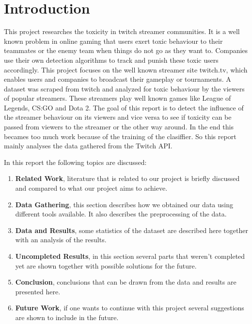 \documentclass[final]{report}
\begin{document}
\chapter{Introduction}
\label{ch:introduction}

This project researches the toxicity in twitch streamer communities.
It is a well known problem in online gaming that users exert toxic behaviour to their teammates or the enemy team when things do not go as they want to.
Companies use their own detection algorithms to track and punish these toxic users accordingly.
This project focuses on the well known streamer site twitch.tv, which enables users and companies to broadcast their gameplay or tournaments.
A dataset was scraped from twitch and analyzed for toxic behaviour by the viewers of popular streamers.
These streamers play well known games like League of Legends, CS:GO and Dota 2.
The goal of this report is to detect the influence of the streamer behaviour on its viewers and vice versa to see if toxicity can be passed from viewers to the streamer or the other way around. In the end this becames too much work because of the training of the clasiffier. So this report mainly analyses the data gathered from the Twitch API.

In this report the following topics are discussed:
\begin{enumerate}
	\item \textbf{Related Work}, literature that is related to our project is briefly discussed and compared to what our project aims to achieve.
	\item \textbf{Data Gathering}, this section describes how we obtained our data using different tools available. It also describes the preprocessing of the data.
	\item \textbf{Data and Results}, some statistics of the dataset are described here together with an analysis  of the results.
	\item \textbf{Uncompleted Results}, in this section several parts that weren't completed yet are shown together with possible solutions for the future.
	\item \textbf{Conclusion}, conclusions that can be drawn from the data and results are presented here.
	\item \textbf{Future Work}, if one wants to continue with this project several suggestions are shown to include in the future.
\end{enumerate}
\end{document}
